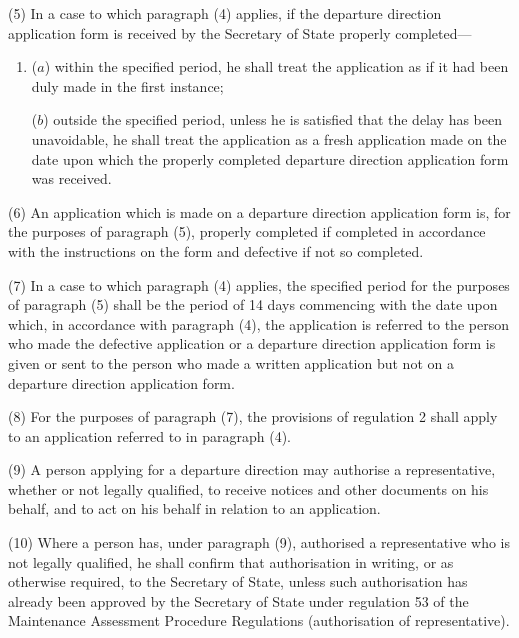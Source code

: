 \documentclass[12pt,a4paper]{article}
\begin{document}
(5) In a case to which paragraph (4) applies, if the departure direction
application form is received by the Secretary of State properly completed—
\begin{enumerate}\item[]
($a$) within the specified period, he shall treat the application as if it had been
duly made in the first instance;

($b$) outside the specified period, unless he is satisfied that the delay has been
unavoidable, he shall treat the application as a fresh application made on the
date upon which the properly completed departure direction application form was
received.
\end{enumerate}

(6) An application which is made on a departure direction application form is,
for the purposes of paragraph (5), properly completed if completed in accordance
with the instructions on the form and defective if not so completed.

(7) In a case to which paragraph (4) applies, the specified period for the
purposes of paragraph (5) shall be the period of 14 days commencing with the
date upon which, in accordance with paragraph (4), the application is referred
to the person who made the defective application or a departure direction
application form is given or sent to the person who made a written application
but not on a departure direction application form.

(8) For the purposes of paragraph (7), the provisions of regulation 2 shall
apply to an application referred to in paragraph (4).

(9) A person applying for a departure direction may authorise a representative,
whether or not legally qualified, to receive notices and other documents on his
behalf, and to act on his behalf in relation to an application.

(10) Where a person has, under paragraph (9), authorised a representative who is
not legally qualified, he shall confirm that authorisation in writing, or as
otherwise required, to the Secretary of State, unless such authorisation has
already been approved by the Secretary of State under regulation 53 of the
Maintenance Assessment Procedure Regulations (authorisation of representative).
\end{document}
